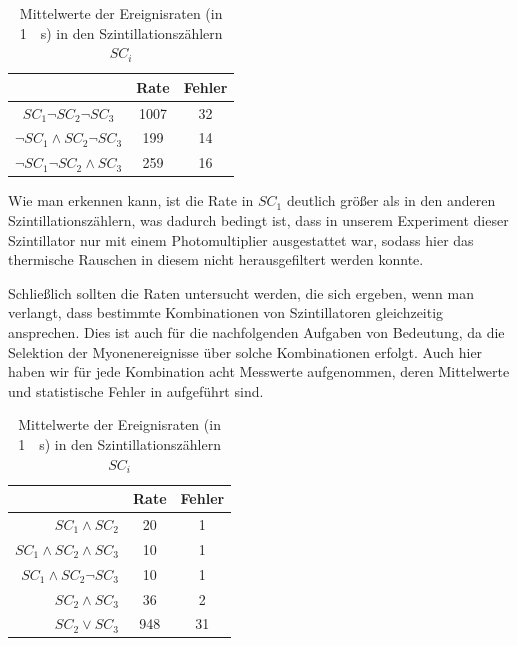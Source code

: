 \begin{table}[htbp]
\centering
\begin{tabular*}{0.8\columnwidth}{c|cc}
\toprule
& Rate & Fehler\\
\midrule
$SC_1 \neg SC_2 \neg SC_3$ & 1007 & 32\\
$\neg SC_1 \wedge SC_2 \neg SC_3$ & 199 & 14\\
$\neg SC_1 \neg SC_2 \wedge SC_3$ & 259 & 16\\
\bottomrule
\end{tabular*}
\caption{Mittelwerte der Ereignisraten (in \SI{1}{\per\second}) in den
Szintillationszählern $SC_i$}
\label{tab:einzelne_szintillatoren}
\end{table}

Wie man erkennen kann, ist die Rate in $SC_1$ deutlich größer als in den
anderen Szintillationszählern, was dadurch bedingt ist, dass in unserem
Experiment dieser Szintillator nur mit einem Photomultiplier ausgestattet war,
sodass hier das thermische Rauschen in diesem nicht herausgefiltert werden
konnte. 

Schließlich sollten die Raten untersucht werden, die sich ergeben, wenn man
verlangt, dass bestimmte Kombinationen von Szintillatoren gleichzeitig
ansprechen. Dies ist auch für die nachfolgenden Aufgaben von Bedeutung, da
die Selektion der Myonenereignisse über solche Kombinationen erfolgt. Auch hier
haben wir für jede Kombination acht Messwerte aufgenommen, deren Mittelwerte
und statistische Fehler in  aufgeführt sind.

\begin{table}[htbp]
\centering
\begin{tabular*}{0.8\columnwidth}{r|cc}
\toprule
& Rate & Fehler\\
\midrule
$SC_1 \wedge SC_2$ & 20 & 1\\
$SC_1 \wedge SC_2 \wedge SC_3$ & 10 & 1\\
$SC_1 \wedge SC_2 \neg SC_3$ & 10 & 1\\
$SC_2 \wedge SC_3$ & 36 & 2\\
$SC_2 \vee SC_3$ & 948 & 31\\
\bottomrule
\end{tabular*}
\caption{Mittelwerte der Ereignisraten (in \SI{1}{\per\second}) in den
Szintillationszählern $SC_i$}
\label{tab:sc_kombinationen}
\end{table}

